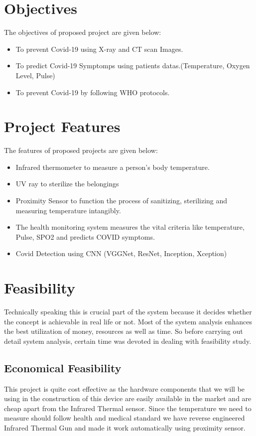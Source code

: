 \documentclass[a4paper,12pt]{report}
\begin{document}
\section{Objectives}
The objectives of proposed project are given below:
\begin{itemize}
\item To prevent Covid-19 using X-ray and CT scan Images.
\item To predict Covid-19 Symptomps using patients datas.(Temperature, Oxygen Level, Pulse)
\item To prevent Covid-19 by following WHO protocols.

\end{itemize}
\section{Project Features}
The features of proposed projects are given below:
\begin{itemize}
\item Infrared thermometer to measure a person’s body temperature.
\item UV ray to sterilize the belongings
\item Proximity Sensor to function the process of sanitizing, sterilizing and measuring temperature intangibly.
\item The health monitoring system measures the vital criteria like temperature, Pulse, SPO2 and predicts COVID symptoms.
\item Covid Detection using CNN (VGGNet, ResNet, Inception, Xception)
\end{itemize}
\section{Feasibility}
Technically speaking this is crucial part of the system because it decides whether the concept
is achievable in real life or not. Most of the system analysis enhances the best utilization of
money, resources as well as time. So before carrying out detail system analysis, certain time
was devoted in dealing with feasibility study.
\subsection{Economical Feasibility}
This project is quite cost effective as the hardware components that we will be using in the
construction of this device are easily available in the market and are cheap apart from the
Infrared Thermal sensor. Since the temperature we need to measure should follow health
and medical standard we have reverse engineered Infrared Thermal Gun and made it work
automatically using proximity sensor. 
\end{document}
